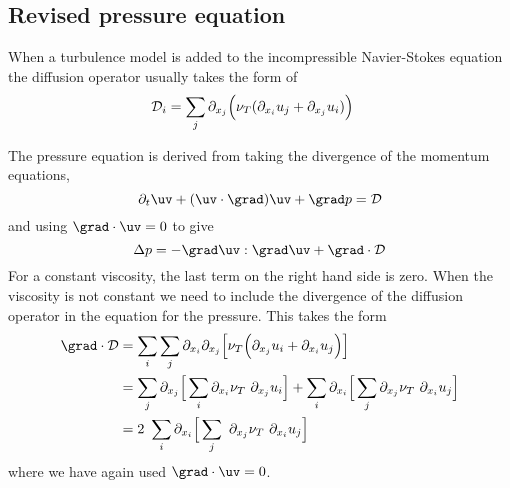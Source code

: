 \subsection{Revised pressure equation}


When a turbulence model is added to the incompressible Navier-Stokes equation the diffusion
operator usually takes the form of 
\begin{align*}
   {\cal D}_i &= \sum_j \partial_{x_j} \Big( \nu_T (\partial_{x_i} u_j + \partial_{x_j} u_i) \Big) 
\end{align*}


The pressure equation is derived from taking the divergence of the momentum equations,
\[
   \partial_t \uv + (\uv\cdot\grad)\uv + \grad p = {\bf\cal D}
\]
and using $\grad\cdot\uv=0$ to give
\[
    \Delta p = - \grad\uv:\grad\uv  + \grad\cdot{\bf\cal D}
\]
For a constant viscosity, the last term on the right hand side is zero.
When the viscosity is not constant we need to include the divergence of the 
diffusion operator in the equation for the pressure. This takes the form
\begin{align*}
   \grad\cdot{\cal D} &= 
           \sum_i\sum_j \partial_{x_i}\partial_{x_j}\Big[ 
                     \nuT\Big( \partial_{x_j} u_i + \partial_{x_i} u_j \Big)
                                   \Big] \\
         &= \sum_j\partial_{x_j}\Big[ \sum_i\partial_{x_i}\nuT~\partial_{x_j} u_i \Big]
           +\sum_i\partial_{x_i}\Big[ \sum_j\partial_{x_j}\nuT~\partial_{x_i} u_j \Big] \\
         &= 2~\sum_i\partial_{x_i}\Big[ \sum_j~\partial_{x_j}\nuT~\partial_{x_i} u_j \Big]
\end{align*}
where we have again used $\grad\cdot\uv=0$.


